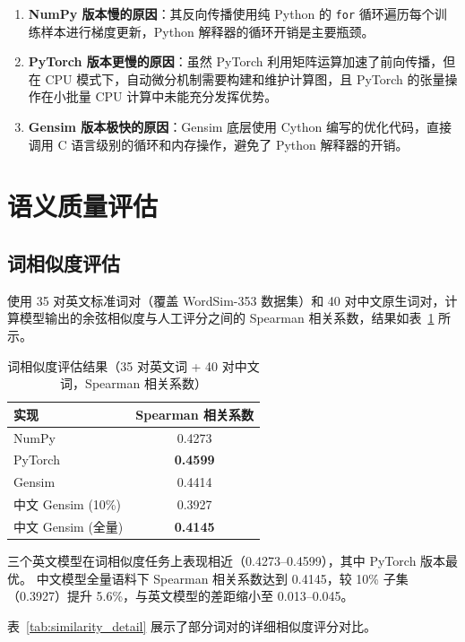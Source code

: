 \begin{enumerate}
  \item \textbf{NumPy 版本慢的原因}：其反向传播使用纯 Python 的 \texttt{for} 循环遍历每个训练样本进行梯度更新，Python 解释器的循环开销是主要瓶颈。
  \item \textbf{PyTorch 版本更慢的原因}：虽然 PyTorch 利用矩阵运算加速了前向传播，但在 CPU 模式下，自动微分机制需要构建和维护计算图，且 PyTorch 的张量操作在小批量 CPU 计算中未能充分发挥优势。
  \item \textbf{Gensim 版本极快的原因}：Gensim 底层使用 Cython 编写的优化代码，直接调用 C 语言级别的循环和内存操作，避免了 Python 解释器的开销。
\end{enumerate}

\section{语义质量评估}

\subsection{词相似度评估}

使用 35 对英文标准词对（覆盖 WordSim-353 数据集）和 40 对中文原生词对，计算模型输出的余弦相似度与人工评分之间的 Spearman 相关系数，结果如表~\ref{tab:similarity} 所示。

\begin{table}[htbp]
\centering
\caption{词相似度评估结果（35 对英文词 + 40 对中文词，Spearman 相关系数）}
\label{tab:similarity}
\begin{tabular}{lc}
\toprule
\textbf{实现} & \textbf{Spearman 相关系数} \\
\midrule
NumPy & 0.4273 \\
PyTorch & \textbf{0.4599} \\
Gensim & 0.4414 \\
中文 Gensim (10\%) & 0.3927 \\
中文 Gensim (全量) & \textbf{0.4145} \\
\bottomrule
\end{tabular}
\end{table}

三个英文模型在词相似度任务上表现相近（0.4273--0.4599），其中 PyTorch 版本最优。
中文模型全量语料下 Spearman 相关系数达到 0.4145，较 10\% 子集（0.3927）提升 5.6\%，与英文模型的差距缩小至 0.013--0.045。

表~\ref{tab:similarity_detail} 展示了部分词对的详细相似度评分对比。

